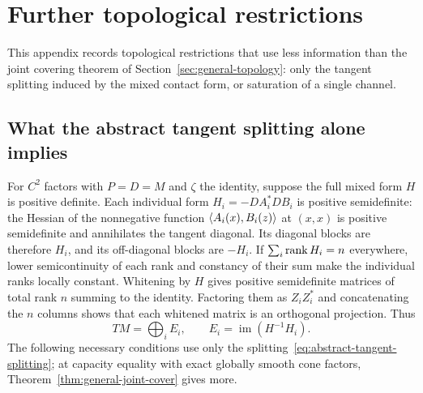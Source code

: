 \section{Further topological restrictions}\label{app:topology-refinements}
This appendix records topological restrictions that use less information
than the joint covering theorem of Section~\ref{sec:general-topology}:
only the tangent splitting induced by the mixed contact form, or
saturation of a single channel.

\subsection{What the abstract tangent splitting alone implies}
For $C^2$ factors with $P=D=M$ and $\zeta$ the identity, suppose the full mixed form
$H$ is positive definite. Each individual form
$H_i=-DA_i^*DB_i$ is positive semidefinite: the Hessian of the
nonnegative function $\langle A_i(x),B_i(z)\rangle$ at $(x,x)$ is positive
semidefinite and annihilates the tangent diagonal. Its diagonal blocks
are therefore $H_i$, and its off-diagonal blocks are $-H_i$.
If $\sum_i\operatorname{rank} H_i=n$ everywhere, lower semicontinuity of each rank
and constancy of their sum make the individual ranks locally constant.
Whitening by $H$ gives positive semidefinite
matrices of total rank $n$ summing to the identity. Factoring them as
$Z_iZ_i^*$ and concatenating the $n$ columns shows that each whitened
matrix is an orthogonal projection. Thus
\begin{equation}\label{eq:abstract-tangent-splitting}
 TM=\bigoplus_i E_i,\qquad E_i=\operatorname{im}(H^{-1}H_i).
\end{equation}
The following necessary conditions use only the
splitting~\eqref{eq:abstract-tangent-splitting}; at capacity equality
with exact globally smooth cone factors,
Theorem~\ref{thm:general-joint-cover} gives more.

